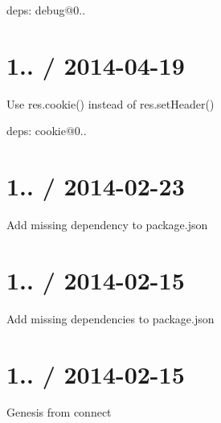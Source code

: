 \begin{DoxyItemize}
\item deps\+: debug@0..
\end{DoxyItemize}

\section*{1.. / 2014-\/04-\/19 }


\begin{DoxyItemize}
\item Use {\ttfamily res.\+cookie()} instead of {\ttfamily res.\+set\+Header()}
\item deps\+: cookie@0..
\end{DoxyItemize}

\section*{1.. / 2014-\/02-\/23 }


\begin{DoxyItemize}
\item Add missing dependency to {\ttfamily package.\+json}
\end{DoxyItemize}

\section*{1.. / 2014-\/02-\/15 }


\begin{DoxyItemize}
\item Add missing dependencies to {\ttfamily package.\+json}
\end{DoxyItemize}

\section*{1.. / 2014-\/02-\/15 }


\begin{DoxyItemize}
\item Genesis from {\ttfamily connect} 
\end{DoxyItemize}